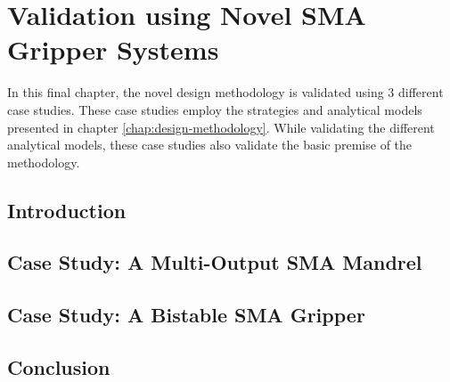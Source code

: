 
\chapter{Validation using Novel SMA Gripper Systems}\label{chap:case-study}
In this final chapter, the novel design methodology is validated using 3 different case studies. These case studies employ the strategies and analytical models presented in chapter \ref{chap:design-methodology}. While validating the different analytical models, these case studies also validate the basic premise of the methodology.
\section{Introduction}
\section{Case Study: A Multi-Output SMA Mandrel}\label{sec:smacm-mandrel}
\section{Case Study: A Bistable SMA Gripper}\label{sec:smabb-gripper}
\section{Conclusion}
